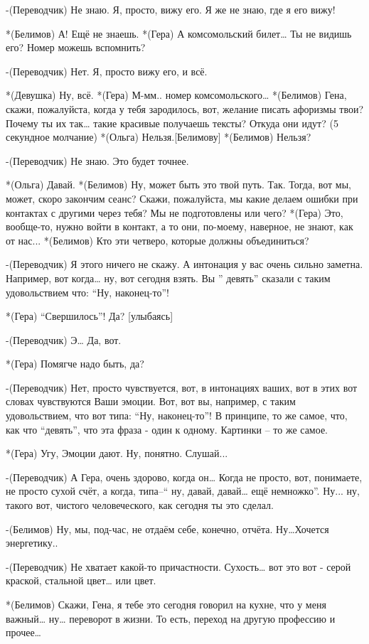 -(Переводчик) Не знаю. Я, просто, вижу его. Я же не знаю, где я его вижу!

*(Белимов) А! Ещё не знаешь.
*(Гера) А комсомольский билет… Ты не видишь его? Номер можешь вспомнить?

-(Переводчик) Нет. Я, просто вижу его, и всё.

*(Девушка) Ну, всё.
*(Гера) М-мм.. номер комсомольского… 
*(Белимов) Гена, скажи, пожалуйста, когда у тебя зародилось, вот, желание писать афоризмы твои? Почему ты их так… такие красивые получаешь тексты? Откуда они идут?
(5 секундное молчание)
*(Ольга) Нельзя.[Белимову]
*(Белимов) Нельзя?

-(Переводчик) Не знаю. Это будет точнее.

*(Ольга) Давай.
*(Белимов) Ну, может быть это твой путь. Так. Тогда, вот мы, может, скоро закончим сеанс? Скажи, пожалуйста, мы какие делаем ошибки при контактах с другими через тебя? Мы не подготовлены или чего?
*(Гера) Это, вообще-то, нужно войти в контакт, а то они, по-моему, наверное,  не знают, как от нас...
*(Белимов) Кто эти четверо, которые должны объединиться?

-(Переводчик) Я этого ничего не скажу. А интонация у вас очень сильно заметна. Например, вот когда… ну, вот сегодня взять. Вы ” девять”  сказали с таким удовольствием что: “Ну, наконец-то”!

*(Гера) “Свершилось”! Да? [улыбаясь]

-(Переводчик) Э… Да, вот. 

*(Гера) Помягче надо быть, да?

-(Переводчик) Нет, просто чувствуется, вот, в интонациях ваших, вот в этих вот словах чувствуются Ваши эмоции. Вот, вот вы, например, с таким удовольствием, что вот типа: “Ну, наконец-то”! В принципе, то же самое, что, как что “девять”, что эта фраза - один к одному. Картинки – то же самое.

*(Гера) Угу, Эмоции дают. Ну, понятно. Слушай...

-(Переводчик) А Гера, очень здорово, когда он… Когда не просто, вот, понимаете, не просто сухой счёт, а когда, типа–“ ну,  давай, давай… ещё немножко”. Ну... ну, такого вот, чистого человеческого, как сегодня ты это сделал. 

-(Белимов) Ну, мы, под-час, не отдаём себе, конечно, отчёта. Ну…Хочется энергетику.. 

-(Переводчик) Не хватает какой-то причастности. Сухость… вот это вот - серой краской, стальной цвет… или цвет.

*(Белимов) Скажи, Гена, я тебе это сегодня говорил на кухне, что у меня важный… ну… переворот в жизни. То есть, переход на другую профессию и прочее…

